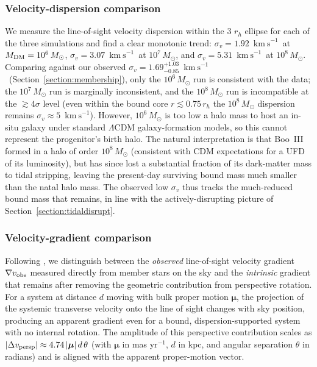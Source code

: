 \documentclass[twocolumn]{aastex631}
\newcommand{\vlosUnits}{$\mathrm{km~s}^{-1}$\xspace}
\begin{document}
\subsubsection{Velocity-dispersion comparison} \label{section:tidaldisrupt_vdisp}
We measure the line-of-sight velocity dispersion within the 3 $r_h$ ellipse for each of the three simulations and find a clear monotonic trend: $\sigma_v = 1.92$~\vlosUnits\ at $M_{\rm DM} = 10^6\,M_\odot$, $\sigma_v = 3.07$~\vlosUnits\ at $10^7\,M_\odot$, and $\sigma_v = 5.31$~\vlosUnits\ at $10^8\,M_\odot$. Comparing against our observed $\sigma_v = 1.69^{+1.03}_{-0.85}$~\vlosUnits\ (Section~\ref{section:membership}), only the $10^6\,M_\odot$ run is consistent with the data; the $10^7\,M_\odot$ run is marginally inconsistent, and the $10^8\,M_\odot$ run is incompatible at the $\gtrsim 4\sigma$ level (even within the bound core $r \lesssim 0.75\,r_h$ the $10^8\,M_\odot$ dispersion remains $\sigma_v \approx 5$~\vlosUnits). However, $10^6\,M_\odot$ is too low a halo mass to host an in-situ galaxy under standard $\Lambda$CDM galaxy-formation models, so this cannot represent the progenitor's birth halo. The natural interpretation is that Boo~III formed in a halo of order $10^8\,M_\odot$ (consistent with CDM expectations for a UFD of its luminosity), but has since lost a substantial fraction of its dark-matter mass to tidal stripping, leaving the present-day surviving bound mass much smaller than the natal halo mass. The observed low $\sigma_v$ thus tracks the much-reduced bound mass that remains, in line with the actively-disrupting picture of Section~\ref{section:tidaldisrupt}.

\subsubsection{Velocity-gradient comparison}
Following \citet{Sandford2025}, we distinguish between the \emph{observed} line-of-sight velocity gradient $\nabla v_{\rm obs}$ measured directly from member stars on the sky and the \emph{intrinsic} gradient that remains after removing the geometric contribution from perspective rotation. For a system at distance $d$ moving with bulk proper motion $\boldsymbol{\mu}$, the projection of the systemic transverse velocity onto the line of sight changes with sky position, producing an apparent gradient even for a bound, dispersion-supported system with no internal rotation. The amplitude of this perspective contribution scales as $|\Delta v_{\rm persp}| \approx 4.74\,|\boldsymbol{\mu}|\,d\,\theta$ (with $\boldsymbol{\mu}$ in mas yr$^{-1}$, $d$ in kpc, and angular separation $\theta$ in radians) and is aligned with the apparent proper-motion vector.
\end{document}
